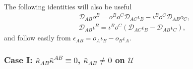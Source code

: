 \documentclass[10pt,a4paper]{article}
\theoremstyle{plain}
\begin{document}
The following identities will also be useful
\begin{subequations}
\begin{eqnarray}
&& \mathcal{D}_{AB}o^B = o^Bo^C\mathcal{D}_{AC}\iota_B - \iota^B o^C\mathcal{D}_{AB}o_C,\\
&& \mathcal{D}_{AB}\iota^B = \iota^B o^C(\mathcal{D}_{AC}\iota_B - \mathcal{D}_{AB}\iota_C),
\end{eqnarray}
\end{subequations}
and follow easily from $\epsilon_{AB}=o_A\iota_B - o_B\iota_A$. 

\subsubsection{Case I: $\bar{\kappa}_{AB}\bar{\kappa}^{AB}\equiv 0$, $\bar{\kappa}_{AB}\neq 0$ on $\mathcal{U}$} \label{TypeNCase}
\end{document}

